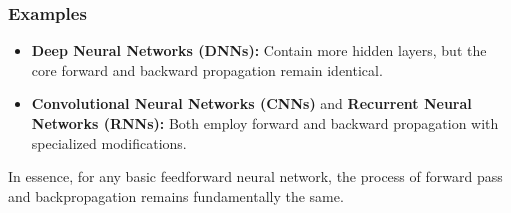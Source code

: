 \documentclass[11pt]{article}
\begin{document}
\subsubsection*{Examples}
\begin{itemize}
    \item \textbf{Deep Neural Networks (DNNs):} Contain more hidden layers, but the core forward and backward propagation remain identical.
    \item \textbf{Convolutional Neural Networks (CNNs)} and \textbf{Recurrent Neural Networks (RNNs):} Both employ forward and backward propagation with specialized modifications.
\end{itemize}

\noindent In essence, for any basic feedforward neural network, the process of forward pass and backpropagation remains fundamentally the same.




\printindex
\end{document}
